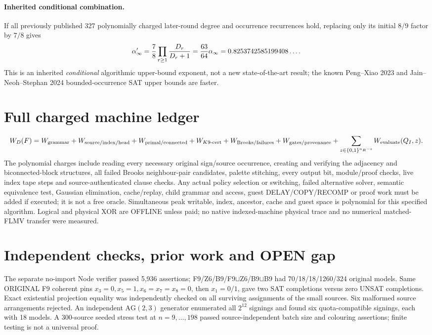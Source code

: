 \documentclass[11pt]{article}
\begin{document}
\paragraph{Inherited conditional combination.} If all previously published 327 polynomially charged later-round degree and occurrence recurrences hold, replacing only its initial $8/9$ factor by $7/8$ gives
\[
\alpha'_\infty={7\over8}\prod_{r\ge1}{D_r\over D_r+1}
={63\over64}\alpha_\infty
=0.8253742585199408\ldots.
\]
This is an inherited \emph{conditional} algorithmic upper-bound exponent, not a new state-of-the-art result; the known Peng--Xiao 2023 and Jain--Neoh--Stephan 2024 bounded-occurrence SAT upper bounds are faster.

\section{Full charged machine ledger}
\[
 W_D(F)=W_{\rm grammar}+W_{\rm source/index/head}
 +W_{\rm primal/connected}+W_{K9\text{-cert}}
 +W_{\rm Brooks/failures}+W_{\rm gates/provenance}
 +\sum_{z\in\{0,1\}^{n_R-s}} W_{\rm evaluate}(Q_I,z).
\]
The polynomial charges include reading every necessary original sign/source occurrence, creating and verifying the adjacency and biconnected-block structures, all failed Brooks neighbour-pair candidates, palette stitching, every output bit, module/proof checks, live index tape steps and source-authenticated clause checks. Any actual policy selection or switching, failed alternative solver, semantic equivalence test, Gaussian elimination, cache/replay, child grammar and access, guest DELAY/COPY/RECOMP or proof work must be added if executed; it is not a free oracle. Simultaneous peak writable, index, ancestor, cache and guest space is polynomial for this specified algorithm. Logical and physical XOR are OFFLINE unless paid; no native indexed-machine physical trace and no numerical matched-FLMV transfer were measured.

\section{Independent checks, prior work and OPEN gap}
The separate no-import Node verifier passed 5,936 assertions; F9/Z6/B9/F9$\sqcup$Z6/B9$\sqcup$B9 had 70/18/18/1260/324 original models. Same ORIGINAL F9 coherent pins $x_3=0,x_5=1,x_6=x_7=x_8=0$, then $x_1=0/1$, gave two SAT completions versus zero UNSAT completions. Exact existential projection equality was independently checked on all surviving assignments of the small sources. Six malformed source arrangements rejected. An independent $\mathrm{AG}(2,3)$ generator enumerated all $2^{12}$ signings and found six quota-compatible signings, each with 18 models. A 300-source seeded stress test at $n=9,\ldots,198$ passed source-independent batch size and colouring assertions; finite testing is not a universal proof.
\end{document}
